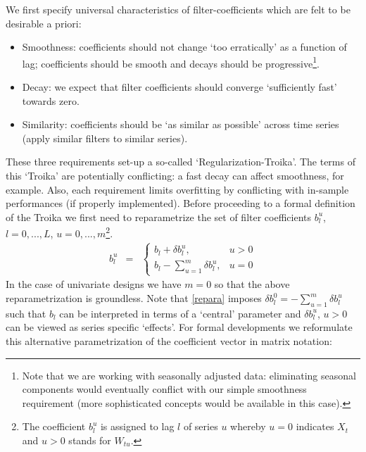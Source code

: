 \documentclass[11pt]{article}
\begin{document}
We first specify universal characteristics of filter-coefficients which are felt to be desirable a priori:
\begin{itemize}
\item Smoothness: coefficients should not change `too erratically' as a function of lag; coefficients should be smooth
and decays should be progressive\footnote{Note that we are working with
seasonally adjusted data: eliminating seasonal components would eventually conflict with
our simple smoothness requirement (more sophisticated concepts would be available in this case).}.
\item Decay: we expect that filter coefficients should converge `sufficiently fast' towards zero.
\item Similarity: coefficients should be `as similar as possible' across time series (apply similar filters to similar series).
\end{itemize}
These three requirements set-up a so-called `Regularization-Troika'. The terms of this `Troika' are potentially conflicting: a fast decay can affect smoothness, for example.
Also, each requirement limits overfitting by conflicting with in-sample performances (if properly implemented). Before proceeding to a formal definition of the Troika we first need to reparametrize the set of filter coefficients $b_l^u$, $l=0,...,L$, $u=0,...,m$\footnote{The coefficient $b_l^u$ is assigned to lag $l$ of series $u$ whereby $u=0$ indicates $X_t$ and $u>0$ stands for $W_{tu}$.}.
\begin{eqnarray}\label{repara}
b_{l}^u&=&\left\{\begin{array} {cc}b_l+\delta b_l^u, &u>0\\
b_l-\sum_{u=1}^m\delta b_l^{u}, &u=0\end{array}\right.
\end{eqnarray}
In the case of univariate designs we have $m=0$ so that the above reparametrization is groundless. Note that \ref{repara} imposes  $\delta b_l^0=-\sum_{u=1}^m\delta b_l^{u}$ such that  $b_l$ can be interpreted  
in terms of a `central' parameter and $\delta b_l^u$, $u>0$ can be viewed as series specific `effects'. For formal developments we reformulate this alternative parametrization of the coefficient vector in matrix notation:
\end{document}
